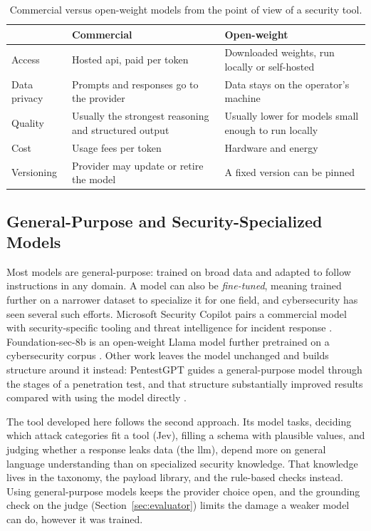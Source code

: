 \begin{table}[htbp]
\centering
\small
\begin{tabular}{p{2.4cm} >{\raggedright\arraybackslash}p{5.6cm} >{\raggedright\arraybackslash}p{5.6cm}}
\hline
 & \textbf{Commercial} & \textbf{Open-weight} \\
\hline
Access & Hosted \acrshort{api}, paid per token & Downloaded weights, run locally or self-hosted \\
Data privacy & Prompts and responses go to the provider & Data stays on the operator's machine \\
Quality & Usually the strongest reasoning and structured output & Usually lower for models small enough to run locally \\
Cost & Usage fees per token & Hardware and energy \\
Versioning & Provider may update or retire the model & A fixed version can be pinned \\
\hline
\end{tabular}
\caption{Commercial versus open-weight models from the point of view of a security tool.}
\label{tab:open-vs-commercial}
\end{table}

\subsection{General-Purpose and Security-Specialized Models}
\label{sec:llm-security-models}

Most models are general-purpose: trained on broad data and adapted to follow instructions in any domain. A model can also be \emph{fine-tuned}, meaning trained further on a narrower dataset to specialize it for one field, and cybersecurity has seen several such efforts. Microsoft Security Copilot pairs a commercial model with security-specific tooling and threat intelligence for incident response \citep{microsoft2023securitycopilot}. Foundation-sec-8b is an open-weight Llama model further pretrained on a cybersecurity corpus \citep{kassianik2025foundationsec}. Other work leaves the model unchanged and builds structure around it instead: PentestGPT guides a general-purpose model through the stages of a penetration test, and that structure substantially improved results compared with using the model directly \citep{deng2024pentestgpt}.

The tool developed here follows the second approach. Its model tasks, deciding which attack categories fit a tool (Jev), filling a schema with plausible values, and judging whether a response leaks data (the \gls{llm}), depend more on general language understanding than on specialized security knowledge. That knowledge lives in the taxonomy, the payload library, and the rule-based checks instead. Using general-purpose models keeps the provider choice open, and the grounding check on the judge (Section~\ref{sec:evaluator}) limits the damage a weaker model can do, however it was trained.

